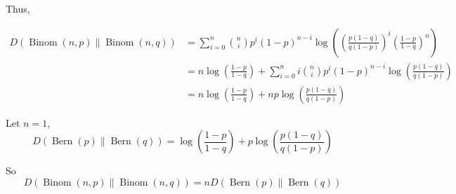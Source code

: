 \documentclass[a4paper]{article}
\begin{document}
\begin{enumerate}
\begin{enumerate}
       Thus,

       \begin{equation}
        \begin{aligned}
          D(\operatorname{Binom}(n, p) \| \operatorname{Binom}(n, q)) &= \sum_{i=0}^n \binom{n}{i}p^i (1-p)^{n-i} \log \left(\left(\frac {p(1-q)}{q(1-p)}\right)^ i \left(\frac {1-p}{1-q}\right)^n\right) \\
          & = n\log \left(\frac {1-p}{1-q}\right) +  \sum_{i=0}^n i\binom{n}{i}p^i (1-p)^{n-i} \log \left(\frac {p(1-q)}{q(1-p)}\right) \\
          & = n\log \left(\frac {1-p}{1-q}\right) + np \log \left(\frac {p(1-q)}{q(1-p)}\right)
        \end{aligned}
      \end{equation}

      Let $n=1$, 
      \begin{equation}
        D(\operatorname{Bern}(p) \| \operatorname{Bern}(q)) = \log \left(\frac {1-p}{1-q}\right) + p \log \left(\frac {p(1-q)}{q(1-p)}\right)
      \end{equation}

      So 
      \begin{equation}
        D(\operatorname{Binom}(n, p) \| \operatorname{Binom}(n, q))=n D(\operatorname{Bern}(p) \| \operatorname{Bern}(q))
      \end{equation}

     \end{enumerate}

    

\end{enumerate}
\end{document}
